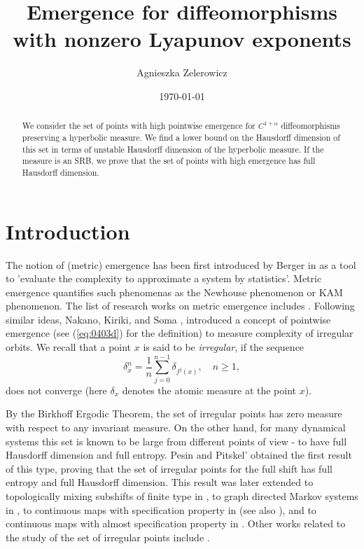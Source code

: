 \documentclass{amsart}
\title[Emergence for diffeomorphisms]{Emergence for diffeomorphisms with nonzero Lyapunov exponents}
\date{\today}
\author{Agnieszka Zelerowicz}
\theoremstyle{plain}
\theoremstyle{definition}
\theoremstyle{remark}
\numberwithin{equation}{section}
\begin{document}
\begin{abstract}
We consider the set of points with high pointwise
emergence for $C^{1+\alpha}$ diffeomorphisms preserving a hyperbolic measure. We find a lower bound on the Hausdorff dimension of this set in terms of unstable Hausdorff dimension of the hyperbolic measure.
If the measure is an SRB, we prove that the set of points with high emergence has full Hausdorff dimension.  
\end{abstract}




\maketitle



\section{Introduction}\label{section:introduction}

The notion of (metric) emergence has been first introduced by Berger in \cite{Berger2017} as a tool to 'evaluate the complexity to
approximate a system by statistics'.
Metric emergence quantifies such phenomenas as the Newhouse phenomenon or KAM phenomenon. The list of research works on metric emergence includes \cite{Berger2020, BBo, BBi, Talebi, CJZ}.
Following similar ideas, Nakano, Kiriki, and Soma \cite{KNS2019}, introduced a concept of pointwise emergence (see (\ref{eq:0403d}) for the definition) to measure complexity of irregular orbits. 
We recall that
a point $x$ is said to be \emph{irregular}, if the sequence
 \begin{equation}\label{eqn:bir-average}
\delta _x^n = \frac{1}{n} \sum _{j=0}^{n-1} \delta _{f^j (x)}, \quad n\geq 1,
\end{equation}
 does not converge (here $\delta_x$ denotes the atomic measure at the point $x$).



By the Birkhoff Ergodic Theorem, the set of irregular points has zero measure with respect to any invariant measure. On the other hand, for many dynamical systems this set is known to be large from different points of view -  to have full Hausdorff dimension and full entropy.  
Pesin and Pitskel' \cite{PP84}   obtained the first result of this type, proving that the set of irregular points for the full shift has full entropy and full Hausdorff dimension. 
This result was later extended to topologically mixing subshifts of finite type in \cite{BS2000}, 
to graph directed Markov systems in \cite{FP2011},
to continuous maps with specification property in \cite{CKS2005} (see also \cite{Thompson2010}), 
and  to continuous maps with almost specification property
in \cite{Thompson2012}.
Other works related to the study of the set of irregular points include \cite{HK1990, Ruelle2001, Takens2008, ABC2011, CZZ2011, CTV2015, Tian2017, BV2017, KS2017, AP2019, BKNSR2020, Yang2020}.
\end{document}
